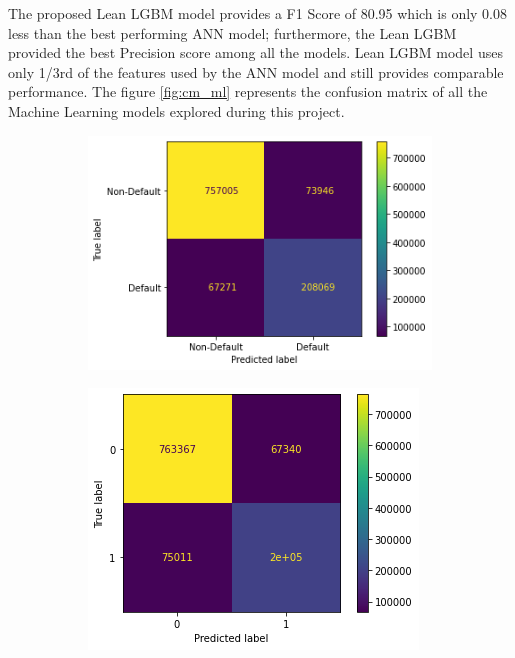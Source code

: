 \documentclass[twoside,11pt,a4paper]{article}
\begin{document}
The proposed Lean \acs{LGBM} model provides a F1 Score of 80.95 which is only 0.08 less than the best performing \acs{ANN} model; furthermore, the Lean \acs{LGBM} provided the best Precision score among all the models. Lean \acs{LGBM} model uses only 1/3rd of the features used by the \acs{ANN} model and still provides comparable performance. The figure \ref{fig:cm_ml} represents the confusion matrix of all the Machine Learning models explored during this project.

\begin{figure}[h!]
	
	\begin{subfigure}{0.4 \textwidth}
		\includegraphics[width=1\linewidth, height=0.8\linewidth]{cm_svm}
		\label{fig:cm_svm}
	\end{subfigure}
	\hfill
	\begin{subfigure}{0.4 \textwidth}
		\includegraphics[width=1\linewidth, height=0.8\linewidth]{cm_rf}

\end{subfigure}
\end{figure}
\end{document}
